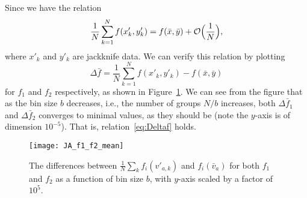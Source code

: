 Since we have the relation
%
\begin{equation}\label{eq:Deltaf}
    \frac{1}{N} \sum_{k=1}^N f(x'_k, y'_k) = f(\bar{x}, \bar{y}) +
    \mathcal{O}\Bigl(\frac{1}{N}\Bigr),
\end{equation}
%
where \(x'_k\) and \(y'_k\) are jackknife data.
We can verify this relation by plotting
%
\begin{equation}
    \Delta \bar{f} = \frac{1}{N} \sum_{k=1}^N f(x'_k, y'_k) - f(\bar{x}, \bar{y})
\end{equation}
%
for \(f_1\) and \(f_2\) respectively, as shown in Figure~\ref{fig:JA_f1_f2_mean}.
We can see from the figure that as the bin size \(b\) decreases, i.e., the number
of groups \(N / b\) increases, both \(\Delta \bar{f}_1\) and \(\Delta \bar{f}_2\)
converges to minimal values, as they should be (note the \(y\)-axis is of dimension
\(10^{-5}\)). That is, relation~\eqref{eq:Deltaf} holds.
%
\begin{figure}[H]
    \centering
    \texttt{[image: JA\_f1\_f2\_mean]}
    \caption{The differences between \(\frac{1}{N} \sum_{k} f_i(v'_{a,k})\)
    and \(f_i(\bar{v}_a)\) for both \(f_1\) and \(f_2\) as a function of bin size
    \(b\), with \(y\)-axis scaled by a factor of \(10^5\).}
    \label{fig:JA_f1_f2_mean}
\end{figure}
